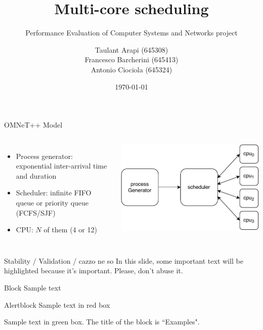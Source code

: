 \documentclass[aspectratio=169,xcolor=dvipsnames]{beamer}
\title{Multi-core scheduling}
\subtitle{Performance Evaluation of Computer Systems and Networks project}
\author{Taulant Arapi (645308)\\Francesco Barcherini (645413)\\Antonio Ciociola (645324)}
\date{\today} %
\begin{document}
\begin{frame}
    \titlepage
\end{frame}

\begin{frame}{OMNeT++ Model}
    \begin{columns}[c] %

    \begin{itemize}
        \item Process generator: exponential inter-arrival time and duration
        \item Scheduler: infinite FIFO queue or priority queue (FCFS/SJF)
        \item CPU: $N$ of them (4 or 12)
    \end{itemize}

    \includegraphics[width=\textwidth]{files/Computer.pdf} %
\end{columns}
    
\end{frame}


\begin{frame}{Stability / Validation / cazzo ne so}
    In this slide, some important text will be \alert{highlighted} because it's important. Please, don't abuse it.

    \begin{block}{Block}
        Sample text
    \end{block}

    \begin{alertblock}{Alertblock}
        Sample text in red box
    \end{alertblock}

    \begin{examples}
        Sample text in green box. The title of the block is ``Examples".
    \end{examples}
\end{frame}
\end{document}
